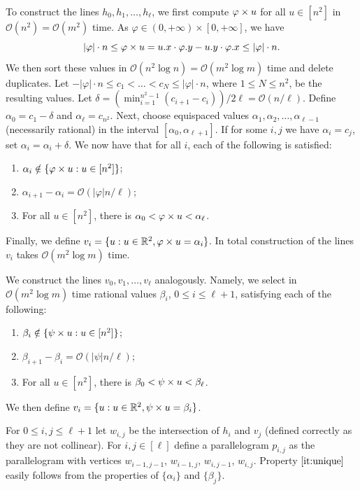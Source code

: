 \documentclass[11pt, letterpaper]{article}
\theoremstyle{plain}
\theoremstyle{definition}
\theoremstyle{remark}
\newcommand{\R}{\mathbb{R}}
\renewcommand{\O}{\mathcal{O}}
\renewcommand{\phi}{\varphi}
\begin{document}
To construct the lines $h_0, h_1, \ldots, h_\ell$, we first compute $\h{u}$ for all $u \in [n^2]$ in $\O(n^2) = \O(m^2)$ time. As $\phi \in (0,+\infty) \times [0,+\infty]$, we have 
$$|\phi| \cdot n \le \h{u} = \x{u} \cdot \y{\phi} - \y{u} \cdot \x{\phi} \le |\phi| \cdot n.$$
We then sort these values in $\O(n^2 \log n) = \O(m^2 \log m)$ time and delete duplicates. Let $-|\phi| \cdot n \le c_1 < \ldots < c_{N} \le |\phi| \cdot n$, where $1 \le N \le n^2$, be the resulting values. Let $\delta = (\min_{i=1}^{n^2-1} (c_{i+1}-c_i))/2\ell = \O(n/\ell)$. Define $\alpha_0 = c_1 -\delta$ and $\alpha_\ell = c_{n^2}$. Next, choose equispaced values $\alpha_1, \alpha_2, \ldots, \alpha_{\ell-1}$ (necessarily rational) in the interval $[\alpha_0, \alpha_{\ell+1}]$. If for some $i, j$ we have $\alpha_i = c_j$, set $\alpha_i = \alpha_i + \delta$. We now have that for all $i$, each of the following is satisfied:
\begin{enumerate}
\item $\alpha_i \notin \{\h{u} : u \in [n^2]\}$;
\item $\alpha_{i+1}-\alpha_i = \O(|\phi| n / \ell)$;
\item For all $u \in [n^2]$, there is $\alpha_0 < \h{u} < \alpha_\ell$.
\end{enumerate}
Finally, we define $v_i = \{u: u \in \R^2, \h{u} = \alpha_i\}$. In total construction of the lines $v_i$ takes $\O(m^2 \log m)$ time.

We construct the lines $v_0, v_1, \ldots, v_\ell$ analogously. Namely, we select in $\O(m^2 \log m)$ time rational values $\beta_i$, $0 \le i \le \ell+1$, satisfying each of the following:
\begin{enumerate}
\item $\beta_i \notin \{\psi \times u : u \in [n^2]\}$;
\item $\beta_{i+1}-\beta_i = \O(|\psi| n / \ell)$;
\item For all $u \in [n^2]$, there is $\beta_0 < \psi \times u < \beta_\ell$.
\end{enumerate}
We then define $v_i = \{u: u \in \R^2, \s{u} = \beta_i\}$. 

For $0 \le i,j \le \ell+1$ let $w_{i,j}$ be the intersection of $h_i$ and $v_j$ (defined correctly as they are not collinear). For $i,j \in [\ell]$ define a parallelogram $p_{i,j}$ as the parallelogram with vertices $w_{i-1,j-1}$, $w_{i-1,j}$, $w_{i,j-1}$, $w_{i,j}$. Property $\ref{it:unique}$ easily follows from the properties of $\{\alpha_i\}$ and $\{\beta_j\}$.
\end{document}
